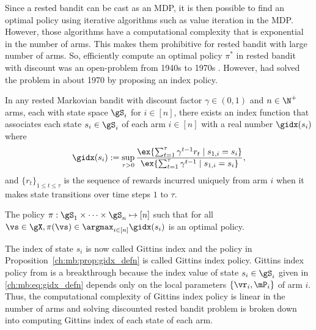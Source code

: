 Since a rested bandit can be cast as an MDP, it is then possible to find an optimal policy using iterative algorithms such as value iteration in the MDP.
However, those algorithms have a computational complexity that is exponential in the number of arms.
This makes them prohibitive for rested bandit with large number of arms.
So, efficiently compute an optimal policy $\pi^*$ in rested bandit with discount was an open-problem from 1940s to 1970s \cite{whittle1996optimal}.
However, \cite{gittins1979bandit} had solved the problem in about 1970 by proposing an index policy.
\begin{prop}
    \label{ch:mb:prop:gidx_defn}
    In any rested Markovian bandit with discount factor $\gamma\in(0,1)$ and $n\in\N^+$ arms, each with state space $\gS_i$ for $i\in[n]$, there exists an index function that associates each state $s_i\in\gS_i$ of each arm $i\in[n]$ with a real number $\gidx(s_i)$ where
    \begin{equation}
        \label{ch:mb:eq:gidx_defn}
        \gidx(s_i):=\sup_{\tau>0}\frac{\ex{\sum_{t=1}^{\tau}\gamma^{t-1}r_t \mid s_{1,i}=s_i}}{\ex{\sum_{t=1}^{\tau}\gamma^{t-1}\mid s_{1,i}=s_i}}, 
    \end{equation}
    and $\{r_t\}_{1\le t\le\tau}$ is the sequence of rewards incurred uniquely from arm $i$ when it makes state transitions over time steps $1$ to $\tau$.

    The policy $\pi:\gS_1\times\dots\times\gS_n\mapsto[n]$ such that for all $\vs\in\gX, \pi(\vs)\in\argmax_{i\in[n]}\gidx(s_i)$ is an optimal policy.
\end{prop}
The index of state $s_i$ is now called Gittins index and the policy in Proposition~\ref{ch:mb:prop:gidx_defn} is called Gittins index policy.
Gittins index policy from \cite{gittins1979bandit} is a breakthrough because the index value of state $s_i\in\gS_i$ given in \eqref{ch:mb:eq:gidx_defn} depends only on the local parameters $\{\vr_i,\mP_i\}$ of arm $i$.
Thus, the computational complexity of Gittins index policy is linear in the number of arms and solving discounted rested bandit problem is broken down into computing Gittins index of each state of each arm.

